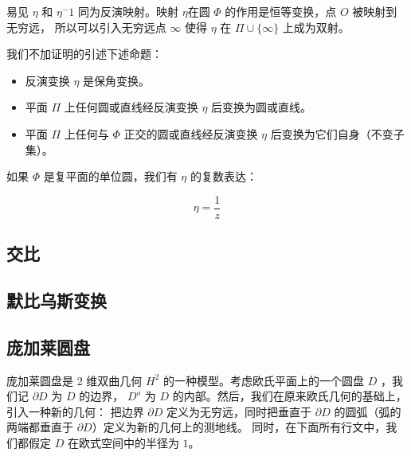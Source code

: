 \documentclass[a4paper,12pt]{article}
\begin{document}
易见 $\eta$ 和 $\eta^-1$ 同为反演映射。映射 $\eta$在圆 $\Phi$ 的作用是恒等变换，点 $O$ 被映射到无穷远，
所以可以引入无穷远点 $\infty$ 使得 $\eta$ 在 $\Pi \cup \{\infty\}$ 上成为双射。

我们不加证明的引述下述命题：

\begin{itemize}
\item 反演变换 $\eta$ 是保角变换。
\item 平面 $\Pi$ 上任何圆或直线经反演变换 $\eta$ 后变换为圆或直线。
\item 平面 $\Pi$ 上任何与 $\Phi$ 正交的圆或直线经反演变换 $\eta$ 后变换为它们自身（不变子集）。
\end{itemize}

如果 $\Phi$ 是复平面的单位圆，我们有 $\eta$ 的复数表达：

$$\eta = \frac{1}{z}$$

\newpage

\subsection{交比}
\newpage

\subsection{默比乌斯变换}
\newpage

\subsection{庞加莱圆盘}

庞加莱圆盘是 2 维双曲几何 $H^2$ 的一种模型。考虑欧氏平面上的一个圆盘 $D$ ，我们记 $\partial D$ 为 $D$ 的边界，
$D^o$ 为 $D$ 的内部。然后，我们在原来欧氏几何的基础上， 引入一种新的几何：
把边界 $\partial D$ 定义为无穷远，同时把垂直于 $\partial D$ 的圆弧（弧的两端都垂直于 $\partial D$）定义为新的几何上的测地线。
同时，在下面所有行文中，我们都假定 $D$ 在欧式空间中的半径为 $1$。
\end{document}
